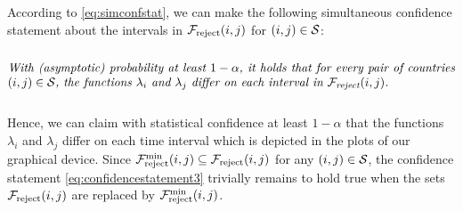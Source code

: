 \documentclass[a4paper,12pt]{article}
\numberwithin{equation}{section}
\begin{document}
According to \eqref{eq:simconfstat}, we can make the following simultaneous confidence statement about the intervals in $\mathcal{F}_{\text{reject}}(i,j)$ for $(i,j) \in \mathcal{S}$: 
\begin{equation}\label{eq:confidencestatement3}
\begin{minipage}[c][1.75cm][c]{13cm}
\textit{With (asymptotic) probability at least $1-\alpha$, it holds that for every pair of countries $(i,j) \in \pairs$, the functions $\lambda_i$ and $\lambda_j$ differ on each interval in $\intervals_{\text{reject}}(i,j)$.} 
\end{minipage}
\end{equation}
Hence, we can claim with statistical confidence at least $1-\alpha$ that the functions $\lambda_i$ and $\lambda_j$ differ on each time interval which is depicted in the plots of our graphical device. Since $\mathcal{F}_{\text{reject}}^{\text{min}}(i,j) \subseteq \mathcal{F}_{\text{reject}}(i,j)$ for any $(i,j) \in \mathcal{S}$, the confidence statement \eqref{eq:confidencestatement3} trivially remains to hold true when the sets $\mathcal{F}_{\text{reject}}(i,j)$ are replaced by $\mathcal{F}_{\text{reject}}^{\text{min}}(i,j)$.
\end{document}
